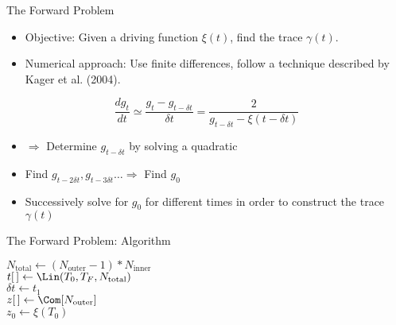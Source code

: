 \documentclass{beamer}
\begin{document}
\begin{frame}{The Forward Problem}
    \begin{itemize}
        \item Objective: Given a driving function $\xi(t)$, find the trace $\gamma(t)$.
        \item Numerical approach: Use finite differences, follow a technique described by Kager et al. (2004).
    \end{itemize}

    \begin{equation*}
        \frac{dg_t}{dt} \simeq \frac{g_t - g_{t - \delta t}}{\delta t} = \frac{2}{g_{t - \delta t} - \xi(t - \delta t)}
    \end{equation*}

    \begin{itemize}
        \item $\Rightarrow$ Determine $g_{t - \delta t}$ by solving a quadratic
        \item  Find $g_{t - 2\delta t},g_{t - 3\delta t} \dots \Rightarrow$ Find $g_0$
        \item  Successively solve for $g_0$ for different times in order to construct the trace $\gamma(t)$
    \end{itemize}

\end{frame}

\begin{frame}{The Forward Problem: Algorithm}
\begin{algorithm}[H]
    \footnotesize


        $ N_{\text{total}} \leftarrow (N_{\text{outer}} - 1)*N_{\text{inner}}$ \\
        $ t[\thinspace] \leftarrow \Lin(T_0,T_F,N_{\text{total}})$ \\
        $ \delta t \leftarrow t_1$ \\

        $ z[\thinspace] \leftarrow \Com[N_{\text{outer}}] $ \\
        $ z_0 \leftarrow \xi(T_0) $ \\

\nl{}
\end{algorithm}
\end{frame}
\end{document}
